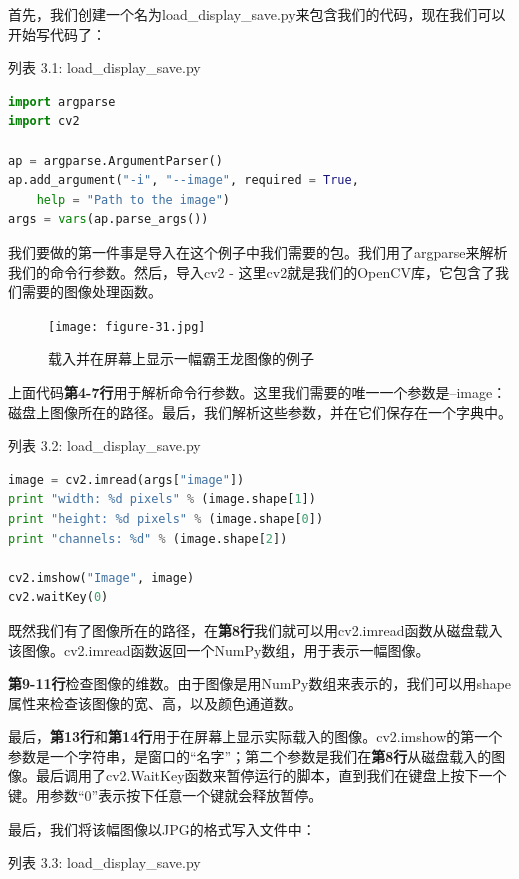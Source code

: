 \documentclass[color=cyan,mathpazo,titlestyle=hang]{elegantbook}
\begin{document}
首先，我们创建一个名为load\_display\_save.py来包含我们的代码，现在我们可以开始写代码了：

列表 3.1: load\_display\_save.py

\begin{lstlisting}[language=python]
import argparse
import cv2

ap = argparse.ArgumentParser()
ap.add_argument("-i", "--image", required = True,
	help = "Path to the image")
args = vars(ap.parse_args())
\end{lstlisting}

我们要做的第一件事是导入在这个例子中我们需要的包。我们用了argparse来解析我们的命令行参数。然后，导入cv2 - 这里cv2就是我们的OpenCV库，它包含了我们需要的图像处理函数。

\begin{figure}[!hbtp]
\centering  %
\texttt{[image: figure-31.jpg]}
\caption{载入并在屏幕上显示一幅霸王龙图像的例子\label{figur:Tyrannosaurus-Rex}}
\end{figure}

上面代码\textbf{第4-7行}用于解析命令行参数。这里我们需要的唯一一个参数是--image：磁盘上图像所在的路径。最后，我们解析这些参数，并在它们保存在一个字典中。

列表 3.2: load\_display\_save.py

\begin{lstlisting}[language=python]
image = cv2.imread(args["image"])
print "width: %d pixels" % (image.shape[1])
print "height: %d pixels" % (image.shape[0])
print "channels: %d" % (image.shape[2])

cv2.imshow("Image", image)
cv2.waitKey(0)
\end{lstlisting}

既然我们有了图像所在的路径，在\textbf{第8行}我们就可以用cv2.imread函数从磁盘载入该图像。cv2.imread函数返回一个NumPy数组，用于表示一幅图像。

\textbf{第9-11行}检查图像的维数。由于图像是用NumPy数组来表示的，我们可以用shape属性来检查该图像的宽、高，以及颜色通道数。

最后，\textbf{第13行}和\textbf{第14行}用于在屏幕上显示实际载入的图像。cv2.imshow的第一个参数是一个字符串，是窗口的“名字”；第二个参数是我们在\textbf{第8行}从磁盘载入的图像。最后调用了cv2.WaitKey函数来暂停运行的脚本，直到我们在键盘上按下一个键。用参数“0”表示按下任意一个键就会释放暂停。

最后，我们将该幅图像以JPG的格式写入文件中：

列表 3.3: load\_display\_save.py
\end{document}
